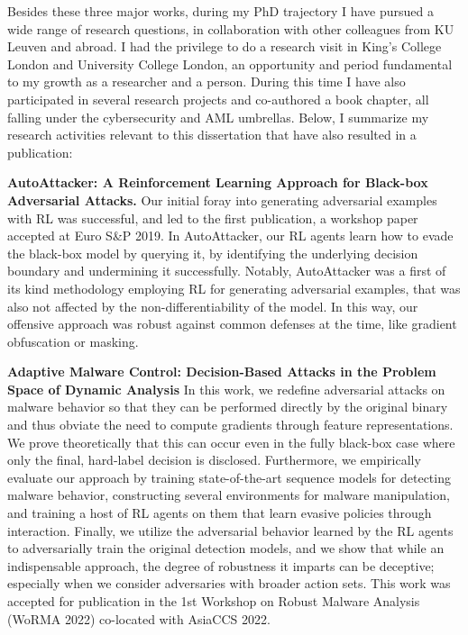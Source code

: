 Besides these three major works, during my PhD trajectory I have pursued a wide range of research questions, in collaboration with other colleagues from KU Leuven and abroad.
I had the privilege to do a research visit in King's College London and University College London, an opportunity and period fundamental to my growth as a researcher and a person.
During this time I have also participated in several research projects and co-authored a book chapter, all falling under the cybersecurity and \gls{AML} umbrellas.
Below, I summarize my research activities relevant to this dissertation that have also resulted in a publication:

\textbf{AutoAttacker: A Reinforcement Learning Approach for Black-box Adversarial Attacks.}
Our initial foray into generating adversarial examples with \gls{RL} was successful, and led to the first publication, a workshop paper accepted at Euro S\&P 2019.
In AutoAttacker, our \gls{RL} agents learn how to evade the black-box model by querying it, by identifying the underlying decision boundary and undermining it successfully.
Notably, AutoAttacker was a first of its kind methodology employing \gls{RL} for generating adversarial examples, that was also not affected by the non-differentiability of the model.
In this way, our offensive approach was robust against common defenses at the time, like gradient obfuscation or masking.

\begin{myleftbar}
\end{myleftbar}

\textbf{Adaptive Malware Control: Decision-Based Attacks in the Problem Space of Dynamic Analysis}
In this work, we redefine adversarial attacks on malware behavior so that they can be performed directly by the original binary and thus obviate the need to compute gradients through feature representations.
We prove theoretically that this can occur even in the fully black-box case where only the final, hard-label decision is disclosed.
Furthermore, we empirically evaluate our approach by training state-of-the-art sequence models for detecting malware behavior, constructing several environments for malware manipulation, and training a host of \gls{RL} agents on them that learn evasive policies through interaction.
Finally, we utilize the adversarial behavior learned by the RL agents to adversarially train the original detection models, and we show that while an indispensable approach, the degree of robustness it imparts can be deceptive; especially when we consider adversaries with broader action sets.
This work was accepted for publication in the 1st Workshop on Robust Malware Analysis (WoRMA 2022) co-located with AsiaCCS 2022.

